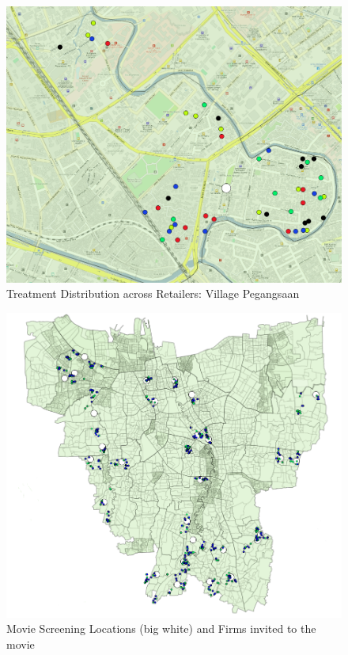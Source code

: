 \documentclass[11.5pt]{article}
\begin{document}
\begin{appendices}
\begin{landscape}
\begin{figure}[h!]
    \centering
    \caption{Treatment Distribution across Retailers: Village Pegangsaan}
   \includegraphics[width=120mm]{FigmapZoom.png}
\end{figure}


\pagebreak

\begin{figure}[h!]
    \centering
    \caption{Movie Screening Locations (big white) and Firms invited to the movie}
   	\includegraphics[width=120mm]{FigmapMovie.png}
\end{figure}

\end{landscape}
\pagebreak



\end{appendices}
\end{document}
